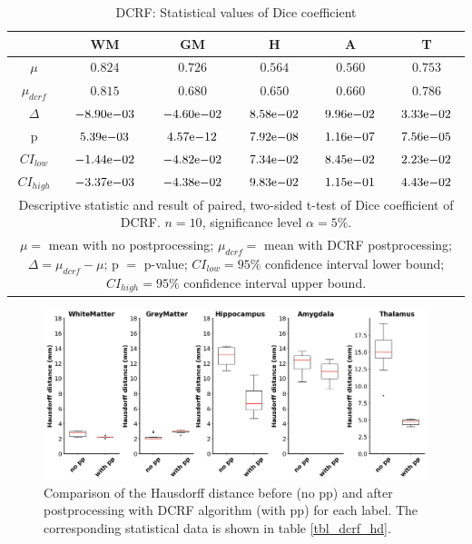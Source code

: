 \documentclass[journal]{IEEEtran}
\begin{document}
\begin{table}[ht]
\renewcommand{\arraystretch}{1.3}
\caption{DCRF: Statistical values of Dice coefficient}
\label{tbl_dcrf_dice}
\centering
\tabcolsep=0.11cm
\begin{tabular}{c|c|c|c|c|c}
\hline
 & WM & GM & H & A & T\\
\hline
$\mu$&$0.824$&$0.726$&$0.564$&$0.560$&$0.753$\\
$\mu_{dcrf}$&$0.815$&$0.680$&$0.650$&$0.660$&$0.786$\\
$\Delta$&${-8.90}\mathrm{e}{-03}$&${-4.60}\mathrm{e}{-02}$&${8.58}\mathrm{e}{-02}$&${9.96}\mathrm{e}{-02}$&${3.33}\mathrm{e}{-02}$\\
p&${5.39}\mathrm{e}{-03}$&${4.57}\mathrm{e}{-12}$&${7.92}\mathrm{e}{-08}$&${1.16}\mathrm{e}{-07}$&${7.56}\mathrm{e}{-05}$\\
$CI_{low}$&${-1.44}\mathrm{e}{-02}$&${-4.82}\mathrm{e}{-02}$&${7.34}\mathrm{e}{-02}$&${8.45}\mathrm{e}{-02}$&${2.23}\mathrm{e}{-02}$\\
$CI_{high}$&${-3.37}\mathrm{e}{-03}$&${-4.38}\mathrm{e}{-02}$&${9.83}\mathrm{e}{-02}$&${1.15}\mathrm{e}{-01}$&${4.43}\mathrm{e}{-02}$\\
\hline
\multicolumn{6}{p{3.4in}}{Descriptive statistic and result of paired, two-sided t-test of Dice coefficient of DCRF. $n=10$, significance level $\alpha = 5\%$. }\\
\multicolumn{6}{p{3.4in}}{$\mu=$ mean with no postprocessing; $\mu_{dcrf}=$ mean with DCRF postprocessing; $\Delta=\mu_{dcrf}-\mu$; p $=$ p-value;  $CI_{low}= 95\%$ confidence interval lower bound; $CI_{high}= 95\%$ confidence interval upper bound.}\\

\end{tabular}
\end{table}



\begin{figure}[ht]
\centering
\includegraphics[width=\textwidth]{img/boxplots/DCRF-HD.png}
\caption{Comparison of the Hausdorff distance before (no pp) and after postprocessing with DCRF algorithm (with pp) for each label. The corresponding statistical data is shown in table \ref{tbl_dcrf_hd}.}
\label{fig_dcrf-hd}
\end{figure}
\end{document}

